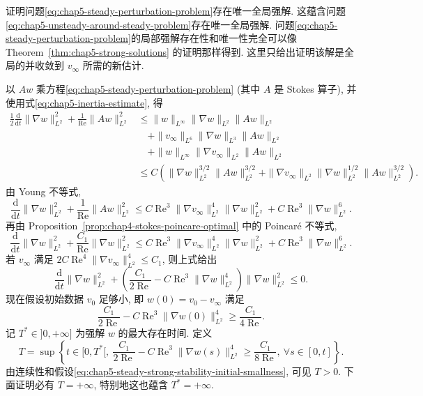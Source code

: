 \begin{Proof}
\begin{sloppypar}
证明问题\eqref{eq:chap5-steady-perturbation-problem}存在唯一全局强解. 这蕴含问题\eqref{eq:chap5-unsteady-around-steady-problem}存在唯一全局强解. 问题\eqref{eq:chap5-steady-perturbation-problem}的局部强解存在性和唯一性完全可以像 Theorem~\ref{thm:chap5-strong-solutions} 的证明那样得到. 这里只给出证明该解是全局的并收敛到 $v_\infty$ 所需的新估计.
\end{sloppypar}

以 $Aw$ 乘方程\eqref{eq:chap5-steady-perturbation-problem} (其中 $A$ 是 Stokes 算子), 并使用式\eqref{eq:chap5-inertia-estimate}, 得
\begin{align*}
 \frac12\frac{\mathrm d}{\mathrm dt}\|\nabla w\|_{L^2}^2
 +\frac1{\operatorname{Re}}\|Aw\|_{L^2}^2
 &\leq\|w\|_{L^\infty}\|\nabla w\|_{L^2}\|Aw\|_{L^2}\\
 &\quad+\|v_\infty\|_{L^6}\|\nabla w\|_{L^3}\|Aw\|_{L^2}\\
 &\quad+\|w\|_{L^\infty}\|\nabla v_\infty\|_{L^2}\|Aw\|_{L^2}\\
 &\leq C\left(\|\nabla w\|_{L^2}^{3/2}\|Aw\|_{L^2}^{3/2}
 +\|\nabla v_\infty\|_{L^2}\|\nabla w\|_{L^2}^{1/2}\|Aw\|_{L^2}^{3/2}\right).
\end{align*}
由 Young 不等式,
\[
 \frac{\mathrm d}{\mathrm dt}\|\nabla w\|_{L^2}^2
 +\frac1{\operatorname{Re}}\|Aw\|_{L^2}^2
 \leq C\operatorname{Re}^3\|\nabla v_\infty\|_{L^2}^4\|\nabla w\|_{L^2}^2
 +C\operatorname{Re}^3\|\nabla w\|_{L^2}^6.
\]
再由 Proposition~\ref{prop:chap4-stokes-poincare-optimal} 中的 Poincaré 不等式,
\[
 \frac{\mathrm d}{\mathrm dt}\|\nabla w\|_{L^2}^2
 +\frac {C_1}{\operatorname{Re}}\|\nabla w\|_{L^2}^2
 \leq C\operatorname{Re}^3\|\nabla v_\infty\|_{L^2}^4\|\nabla w\|_{L^2}^2
 +C\operatorname{Re}^3\|\nabla w\|_{L^2}^6.
\]
若 $v_\infty$ 满足 $2C\operatorname{Re}^4\|\nabla v_\infty\|_{L^2}^4\leq C_1$, 则上式给出
\begin{equation}
 \frac{\mathrm d}{\mathrm dt}\|\nabla w\|_{L^2}^2
 +\left(\frac {C_1}{2\operatorname{Re}}
 -C\operatorname{Re}^3\|\nabla w\|_{L^2}^4\right)
 \|\nabla w\|_{L^2}^2\leq0.
\label{eq:chap5-steady-strong-stability-differential}
\end{equation}
现在假设初始数据 $v_0$ 足够小, 即 $w(0)=v_0-v_\infty$ 满足
\begin{equation}
 \frac {C_1}{2\operatorname{Re}}
 -C\operatorname{Re}^3\|\nabla w(0)\|_{L^2}^4
 \geq\frac{C_1}{4\operatorname{Re}}.
\label{eq:chap5-steady-strong-stability-initial-smallness}
\end{equation}
记 $T^*\in]0,+\infty]$ 为强解 $w$ 的最大存在时间. 定义
\begin{equation}
 T=\sup\left\{t\in[0,T^*[,
 \ \frac {C_1}{2\operatorname{Re}}
 -C\operatorname{Re}^3\|\nabla w(s)\|_{L^2}^4
 \geq\frac{C_1}{8\operatorname{Re}},
 \ \forall s\in[0,t]\right\}.
\label{eq:chap5-steady-strong-stability-maximal-time}
\end{equation}
由连续性和假设\eqref{eq:chap5-steady-strong-stability-initial-smallness}, 可见 $T>0$. 下面证明必有 $T=+\infty$, 特别地这也蕴含 $T^*=+\infty$.


\end{Proof}
